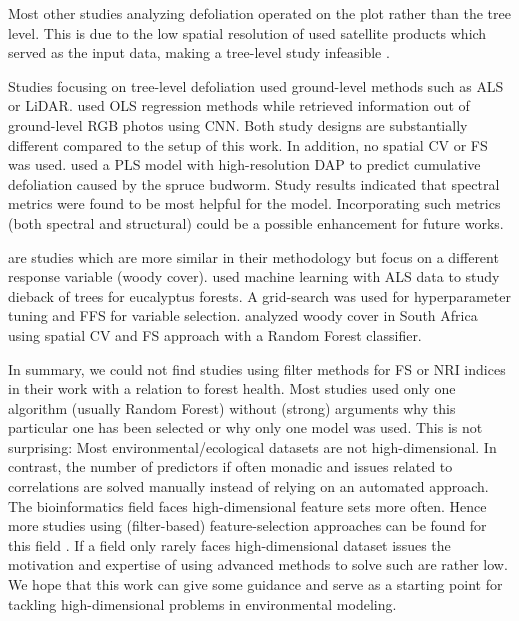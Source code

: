 \documentclass[letterpaper, peerreview]{IEEEtran}
\begin{document}
\noindent Most other studies analyzing defoliation operated on the plot rather than the tree level.
This is due to the low spatial resolution of used satellite products which served as the input data, making a tree-level study infeasible \cite{townsend2012, debeurs2008, rengarajan2016}.

Studies focusing on tree-level defoliation used ground-level methods such as \ac{ALS} or \ac{LiDAR}\cite{meng2018, kalin2019}.
\cite{meng2018} used \ac{OLS} regression methods while\cite{kalin2019} retrieved information out of ground-level RGB photos using \ac{CNN}.
Both study designs are substantially different compared to the setup of this work.
In addition, no spatial \ac{CV} or \ac{FS} was used.
\cite{goodbody2018} used a \ac{PLS} model with high-resolution \ac{DAP} to predict cumulative defoliation caused by the spruce budworm.
Study results indicated that spectral metrics were found to be most helpful for the model.
Incorporating such metrics (both spectral and structural) could be a possible enhancement for future works.

\cite{shendryk2016, ludwig2019} are studies which are more similar in their methodology but focus on a different response variable (woody cover).
\cite{shendryk2016} used machine learning with \ac{ALS} data to study dieback of trees for eucalyptus forests.
A grid-search was used for hyperparameter tuning and \ac{FFS} for variable selection.
\cite{ludwig2019} analyzed woody cover in South Africa using spatial \ac{CV} and \ac{FS} approach \cite{meyer2018} with a Random Forest classifier.

In summary, we could not find studies using filter methods for \ac{FS} or \ac{NRI} indices in their work with a relation to forest health.
Most studies used only one algorithm (usually Random Forest) without (strong) arguments why this particular one has been selected or why only one model was used.
This is not surprising: Most environmental/ecological datasets are not high-dimensional.
In contrast, the number of predictors if often monadic and issues related to correlations are solved manually instead of relying on an automated approach.
The bioinformatics field faces high-dimensional feature sets more often.
Hence more studies using (filter-based) feature-selection approaches can be found for this field \cite{guo2019, radovic2017}.
If a field only rarely faces high-dimensional dataset issues the motivation and expertise of using advanced methods to solve such are rather low.
We hope that this work can give some guidance and serve as a starting point for tackling high-dimensional problems in environmental modeling.
\end{document}
